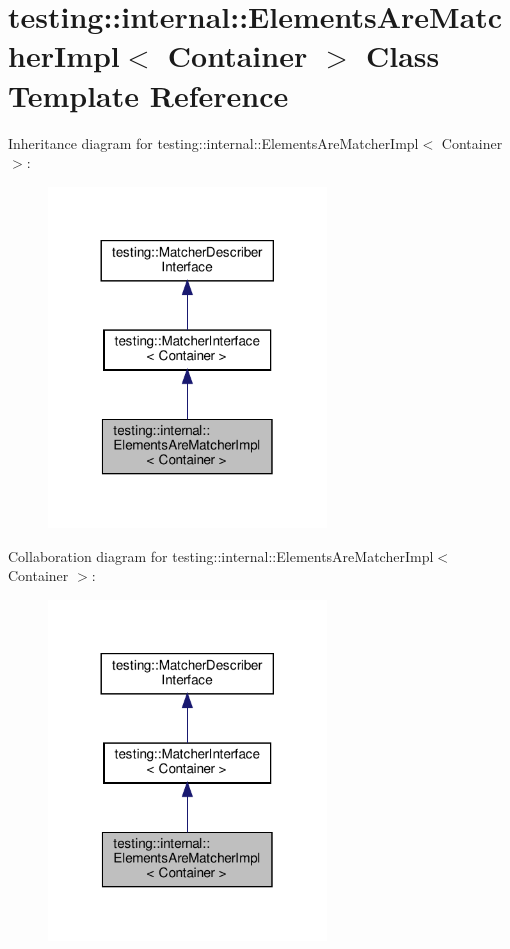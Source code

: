 \hypertarget{classtesting_1_1internal_1_1_elements_are_matcher_impl}{}\section{testing\+:\+:internal\+:\+:Elements\+Are\+Matcher\+Impl$<$ Container $>$ Class Template Reference}
\label{classtesting_1_1internal_1_1_elements_are_matcher_impl}


Inheritance diagram for testing\+:\+:internal\+:\+:Elements\+Are\+Matcher\+Impl$<$ Container $>$\+:
\nopagebreak
\begin{figure}[H]
\begin{center}
\leavevmode
\includegraphics[width=209pt]{classtesting_1_1internal_1_1_elements_are_matcher_impl__inherit__graph}
\end{center}
\end{figure}


Collaboration diagram for testing\+:\+:internal\+:\+:Elements\+Are\+Matcher\+Impl$<$ Container $>$\+:
\nopagebreak
\begin{figure}[H]
\begin{center}
\leavevmode
\includegraphics[width=209pt]{classtesting_1_1internal_1_1_elements_are_matcher_impl__coll__graph}
\end{center}
\end{figure}
